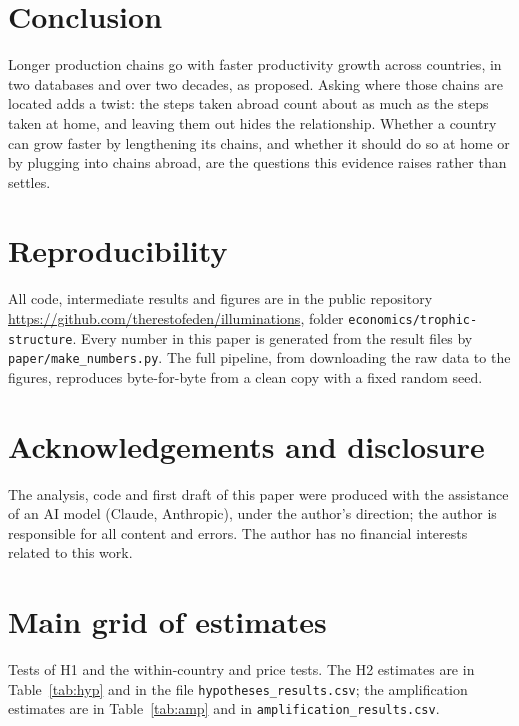 \documentclass[11pt,a4paper]{article}
\begin{document}
\section{Conclusion}

Longer production chains go with faster productivity growth across countries, in
two databases and over two decades, as \citet{mcnerney2022} proposed. Asking
where those chains are located adds a twist: the steps taken abroad count about as
much as the steps taken at home, and leaving them out hides the relationship.
Whether a country can grow faster by lengthening its chains, and whether it should
do so at home or by plugging into chains abroad, are the questions this evidence
raises rather than settles.

\section{Reproducibility}\label{sec:repro}

All code, intermediate results and figures are in the public repository
\url{https://github.com/therestofeden/illuminations}, folder
\texttt{economics/trophic-structure}. Every number in this paper is generated
from the result files by \texttt{paper/make\_numbers.py}. The full pipeline, from
downloading the raw data to the figures, reproduces byte-for-byte from a clean
copy with a fixed random seed.

\section*{Acknowledgements and disclosure}
The analysis, code and first draft of this paper were produced with the
assistance of an AI model (Claude, Anthropic), under the author's direction; the
author is responsible for all content and errors. The author has no financial
interests related to this work.




\appendix
\section{Main grid of estimates}\label{app:all}
{\sloppy Tests of H1 and the within-country and price tests. The H2 estimates are in
Table~\ref{tab:hyp} and in the file \texttt{hypotheses\_results.csv}; the
amplification estimates are in Table~\ref{tab:amp} and in
\texttt{amplification\_results.csv}.\par}

{\footnotesize
\setlength{\tabcolsep}{4pt}

}
\end{document}
